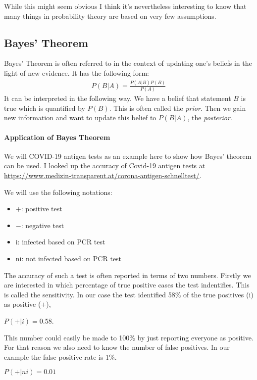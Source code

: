 While this might seem obvious I think it's nevertheless interesting to know that many things in probability theory are based on very few assumptions.

\subsection{Bayes' Theorem}
Bayes' Theorem is often referred  to in the context of updating one's beliefs in the light of new evidence.
It has the following form:
\begin{align}
  P(B|A) = \frac{P(A|B)P(B)}{P(A)}
\end{align}
It can be interpreted in the following way. We have a belief that statement $B$ is true which is quantified by $P(B)$.
This is often called the \emph{prior}.
Then we gain new information and want to update this belief to $P(B|A)$, the \emph{posterior}.

\paragraph{Application of Bayes Theorem}
We will COVID-19 antigen tests as an example here to show how Bayes' theorem can be used.
I looked up the accuracy of Covid-19 antigen tests at
\url{https://www.medizin-transparent.at/corona-antigen-schnelltest/}.

We will use the following notations:
\begin{itemize}
  \item $+$: positive test
  \item $-$: negative test
  \item i: infected based on PCR test
  \item ni: not infected based on PCR test
\end{itemize}

The accuracy of such a test is often reported in terms of two numbers.
Firstly we are interested in which percentage of true positive cases 
the test indentifies. This is called the sensitivity.
In our case the test identified 58\% of the true positives (i) as positive ($+$),
\begin{center}
    $P(+|i)=0.58$.
\end{center}
This number could easily be made to 100\% by just reporting everyone as positive.
For that reason we also need to know the number of false positives.
In our example the false positive rate is 1\%.
\begin{center}
    $P(+|ni)=0.01$
\end{center}


